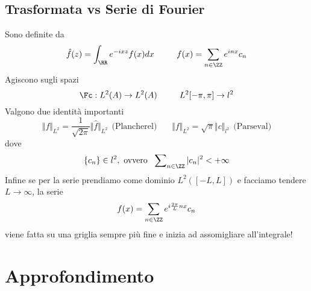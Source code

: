 \section{Trasformata vs Serie di Fourier}

Sono definite da
\begin{equation*}
\hat{f}(z) = \int_{\RR} e^{- ixz} f(x) dx\ \ \ \ \ \ \ \ f(x) = \sum_{n\in \ZZ} e^{inx} c_{n}
\end{equation*}
Agiscono sugli spazi
\begin{equation*}
\Fc : L^{2}(A)\rightarrow L^{2}(A) \ \ \ \ \ \ \ \ L^{2}[ - \pi, \pi]\rightarrow l^{2}
\end{equation*}
Valgono due identità importanti
\begin{equation*}
\Vert f \Vert_{L^{2}} = \frac{1}{\sqrt{2\pi}} \Vert \hat{f} \Vert_{L^{2}} \ \ \text{(Plancherel)} \ \ \ \ \ \ \ \ \Vert f \Vert_{L^{2}} = \sqrt{\pi} \Vert c \Vert_{l^{2}} \ \ \text{(Parseval)}
\end{equation*}
dove
\begin{equation*}
\{c_{n}\} \in l^{2}, \ \text{ovvero} \ \ \sum\nolimits_{n\in \ZZ}| c_{n}|^{2} < + \infty
\end{equation*}
Infine se per la serie prendiamo come dominio $L^{2}([ - L, L])$ e facciamo tendere $L\rightarrow \infty $, la serie
\begin{equation*}
f(x) = \sum_{n\in \ZZ} e^{i\frac{2\pi}{L} nx} c_{n}
\end{equation*}
viene fatta su una griglia sempre più fine e inizia ad assomigliare all'integrale!



\makeatletter
\def\cleardoublepage{\clearpage\if@twoside \ifodd\c@page\else
    \hbox{}
    \vspace*{\fill}
    \vspace{\fill}
    \thispagestyle{empty}
    \newpage
    \if@twocolumn\hbox{}\newpage\fi\fi\fi}
\makeatother

\pagestyle{fancy}
\renewcommand{\chaptermark}[1]{\markboth{#1}{}}
\renewcommand{\sectionmark}[1]{\markright{\thesection\ #1}}
\fancyhf{}
\fancyhead[LE,RO]{\scshape\thepage}
\fancyhead[LO]{\scshape\footnotesize\nouppercase{\rightmark}} 
\fancyhead[RE]{\scshape\footnotesize\nouppercase{\leftmark}} 
 

\appendix 


\chapter{Approfondimento}
\label{myprod}

